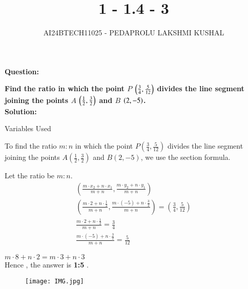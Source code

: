 \documentclass[journal]{IEEEtran}
\begin{document}

\vspace{3cm}

\title{1 - 1.4 - 3}
\author{AI24BTECH11025 - PEDAPROLU LAKSHMI KUSHAL
}
{\let\newpage\relax\maketitle}

\renewcommand{\thefigure}{\theenumi}
\renewcommand{\thetable}{\theenumi}
\setlength{\intextsep}{10pt} %


\renewcommand{\thetable}{\theenumi}


\textbf{Question:}

\textbf{Find the ratio in which the point \(P \) $\left(\frac{3}{4}, \frac{5}{12} \right)$ divides the line segment joining the points \(A \) $\left(\frac{1}{2},\frac{3}{2}\right)$ and \(B \) $\left(2,-5\right)$.}
\\

\textbf{Solution:}\\
\begin{table}[h!]    
  \centering
  
  \caption{Variables Used}
  \label{tab}
\end{table}
To find the ratio \( m : n \) in which the point \( P\left(\frac{3}{4}, \frac{5}{12}\right) \) divides the line segment joining the points \( A\left(\frac{1}{2}, \frac{3}{2}\right) \) and \( B(2, -5) \), we use the section formula.

Let the ratio be \( m : n \).
\begin{align}
\left( \frac{m \cdot x_2 + n \cdot x_1}{m+n}, \frac{m \cdot y_2 + n \cdot y_1}{m+n} \right) \\
\left( \frac{m \cdot 2 + n \cdot \frac{1}{2}}{m+n}, \frac{m \cdot (-5) + n \cdot \frac{3}{2}}{m+n} \right) = \left(\frac{3}{4}, \frac{5}{12}\right) \\
\frac{m \cdot 2 + n \cdot \frac{1}{2}}{m+n} = \frac{3}{4} \\
\frac{m \cdot (-5) + n \cdot \frac{3}{2}}{m+n} = \frac{5}{12} 
\end{align}

$ m\cdot8 + n\cdot2 = m\cdot3 + n\cdot3 $\\
Hence , the answer is \textbf{1:5} .

\begin{figure}[h]
	\centering
	\texttt{[image: IMG.jpg]}
	\label{Fig}
\end{figure}
\end{document}
